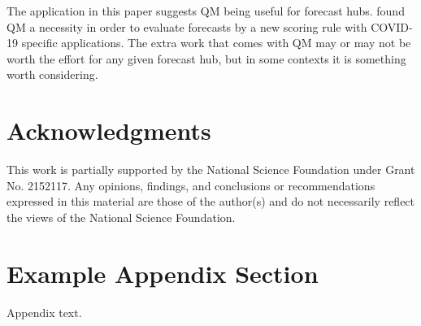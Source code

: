 \documentclass[preprint,12pt,authoryear]{elsarticle}
\begin{document}
The application in this paper suggests QM being useful for forecast hubs.  \cite{gerding2023evaluating} found QM a necessity in order to evaluate forecasts by a new scoring rule with COVID-19 specific applications. The extra work that comes with QM may or may not be worth the effort for any given forecast hub, but in some contexts it is something worth considering.


\section{Acknowledgments}
This work is partially supported by the National Science Foundation under Grant No. 2152117. Any opinions, findings, and conclusions or recommendations expressed in this material are those of the author(s) and do not necessarily reflect the views of the National Science Foundation.

\appendix
\section{Example Appendix Section}
\label{app1}

Appendix text.







% 
% 
% 
\end{document}
